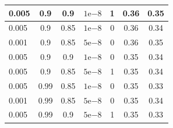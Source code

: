 \begin{table}[]
\begin{tabular}{lcccc|cc|}
\multicolumn{1}{|l|}{0.005}                         & \multicolumn{1}{c|}{0.9}                         & \multicolumn{1}{c|}{0.9}                          & \multicolumn{1}{c|}{$1\mathrm{e}{-8}$}                         & 1       & \multicolumn{1}{c|}{0.36}                         & 0.35    \\ \hline
\multicolumn{1}{|l|}{0.005}                         & \multicolumn{1}{c|}{0.9}                         & \multicolumn{1}{c|}{0.85}                         & \multicolumn{1}{c|}{$1\mathrm{e}{-8}$}                         & 0       & \multicolumn{1}{c|}{0.36}                         & 0.34    \\ \hline
\multicolumn{1}{|l|}{0.001}                         & \multicolumn{1}{c|}{0.9}                         & \multicolumn{1}{c|}{0.85}                         & \multicolumn{1}{c|}{$5\mathrm{e}{-8}$}                         & 0       & \multicolumn{1}{c|}{0.36}                         & 0.35    \\ \hline
\multicolumn{1}{|l|}{0.005}                         & \multicolumn{1}{c|}{0.9}                         & \multicolumn{1}{c|}{0.9}                          & \multicolumn{1}{c|}{$1\mathrm{e}{-8}$}                         & 0       & \multicolumn{1}{c|}{0.35}                         & 0.34    \\ \hline
\multicolumn{1}{|l|}{0.005}                         & \multicolumn{1}{c|}{0.9}                         & \multicolumn{1}{c|}{0.85}                         & \multicolumn{1}{c|}{$5\mathrm{e}{-8}$}                         & 1       & \multicolumn{1}{c|}{0.35}                         & 0.34    \\ \hline
\multicolumn{1}{|l|}{0.005}                         & \multicolumn{1}{c|}{0.99}                        & \multicolumn{1}{c|}{0.85}                         & \multicolumn{1}{c|}{$1\mathrm{e}{-8}$}                         & 0       & \multicolumn{1}{c|}{0.35}                         & 0.33    \\ \hline
\multicolumn{1}{|l|}{0.001}                         & \multicolumn{1}{c|}{0.99}                        & \multicolumn{1}{c|}{0.85}                         & \multicolumn{1}{c|}{$5\mathrm{e}{-8}$}                         & 0       & \multicolumn{1}{c|}{0.35}                         & 0.34    \\ \hline
\multicolumn{1}{|l|}{0.005}                         & \multicolumn{1}{c|}{0.99}                        & \multicolumn{1}{c|}{0.9}                          & \multicolumn{1}{c|}{$5\mathrm{e}{-8}$}                         & 1       & \multicolumn{1}{c|}{0.35}                         & 0.33    \\ \hline

\end{tabular}
\end{table}
